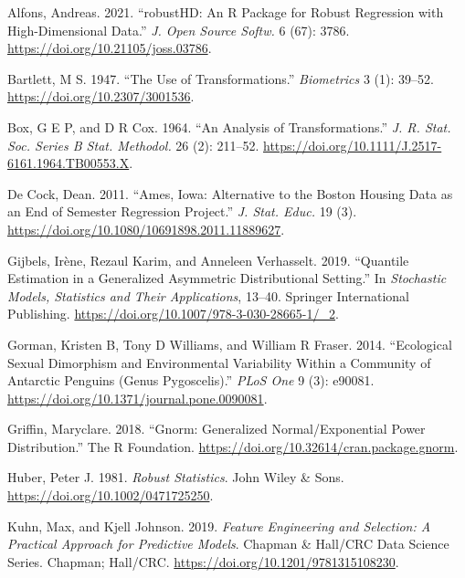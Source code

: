 \documentclass[
  a4paper,
]{article}
\newlength{\cslhangindent}
\newenvironment{CSLReferences}[2] %
 {\begin{list}{}{%
  \setlength{\itemindent}{0pt}
  \setlength{\leftmargin}{0pt}
  \setlength{\parsep}{0pt}
  \ifodd #1
   \setlength{\leftmargin}{\cslhangindent}
   \setlength{\itemindent}{-1\cslhangindent}
  \fi
  \setlength{\itemsep}{#2\baselineskip}}}
 {\end{list}}
\begin{document}
\label{refs}
\begin{CSLReferences}{1}{0}
Alfons, Andreas. 2021. {``{robustHD}: An {R} Package for Robust
Regression with High-Dimensional Data.''} \emph{J. Open Source Softw.} 6
(67): 3786. \url{https://doi.org/10.21105/joss.03786}.

Bartlett, M S. 1947. {``The Use of Transformations.''} \emph{Biometrics}
3 (1): 39--52. \url{https://doi.org/10.2307/3001536}.

Box, G E P, and D R Cox. 1964. {``An Analysis of Transformations.''}
\emph{J. R. Stat. Soc. Series B Stat. Methodol.} 26 (2): 211--52.
\url{https://doi.org/10.1111/J.2517-6161.1964.TB00553.X}.

De Cock, Dean. 2011. {``Ames, Iowa: Alternative to the Boston Housing
Data as an End of Semester Regression Project.''} \emph{J. Stat. Educ.}
19 (3). \url{https://doi.org/10.1080/10691898.2011.11889627}.

Gijbels, Irène, Rezaul Karim, and Anneleen Verhasselt. 2019. {``Quantile
Estimation in a Generalized Asymmetric Distributional Setting.''} In
\emph{Stochastic Models, Statistics and Their Applications}, 13--40.
Springer International Publishing.
\url{https://doi.org/10.1007/978-3-030-28665-1/_2}.

Gorman, Kristen B, Tony D Williams, and William R Fraser. 2014.
{``Ecological Sexual Dimorphism and Environmental Variability Within a
Community of Antarctic Penguins (Genus Pygoscelis).''} \emph{PLoS One} 9
(3): e90081. \url{https://doi.org/10.1371/journal.pone.0090081}.

Griffin, Maryclare. 2018. {``Gnorm: Generalized Normal/Exponential Power
Distribution.''} The R Foundation.
\url{https://doi.org/10.32614/cran.package.gnorm}.

Huber, Peter J. 1981. \emph{Robust Statistics}. John Wiley \& Sons.
\url{https://doi.org/10.1002/0471725250}.

Kuhn, Max, and Kjell Johnson. 2019. \emph{Feature Engineering and
Selection: A Practical Approach for Predictive Models}. Chapman \&
Hall/CRC Data Science Series. Chapman; Hall/CRC.
\url{https://doi.org/10.1201/9781315108230}.


\end{CSLReferences}
\end{document}
